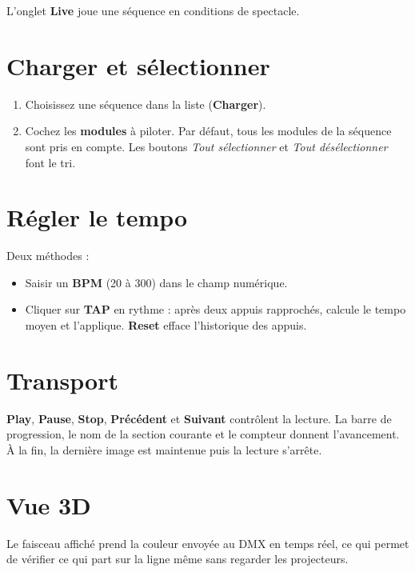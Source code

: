 L'onglet \textbf{Live} joue une séquence en conditions de spectacle.

\section{Charger et sélectionner}

\begin{enumerate}[leftmargin=1.6em]
  \item Choisissez une séquence dans la liste (\textbf{Charger}).
  \item Cochez les \textbf{modules} à piloter. Par défaut, tous les modules de la
        séquence sont pris en compte. Les boutons \emph{Tout sélectionner} et
        \emph{Tout désélectionner} font le tri.
\end{enumerate}

\section{Régler le tempo}

Deux méthodes :

\begin{itemize}[leftmargin=1.4em]
  \item Saisir un \textbf{BPM} (20 à 300) dans le champ numérique.
  \item Cliquer sur \textbf{TAP} en rythme : après deux appuis rapprochés,
        \Icare{} calcule le tempo moyen et l'applique. \textbf{Reset} efface
        l'historique des appuis.
\end{itemize}

\section{Transport}

\textbf{Play}, \textbf{Pause}, \textbf{Stop}, \textbf{Précédent} et
\textbf{Suivant} contrôlent la lecture. La barre de
progression, le nom de la section courante et le compteur 
donnent l'avancement. À la fin, la dernière image est maintenue puis la lecture
s'arrête.

\section{Vue 3D}

Le faisceau affiché prend la couleur envoyée au DMX en temps réel, ce qui permet
de vérifier ce qui part sur la ligne même sans regarder les projecteurs.

